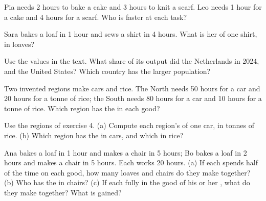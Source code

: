 \begin{exercise}[$\star$]\label{exo:g7:comparative-advantage:1}
Pia needs 2 hours to bake a cake and 3 hours to knit a scarf. Leo needs 1 hour for a cake
and 4 hours for a scarf. Who is faster at each task?
\end{exercise}

\begin{exercise}[$\star$]\label{exo:g7:comparative-advantage:2}
Sara bakes a loaf in 1 hour and sews a shirt in 4 hours. What is her  of
one shirt, in loaves?
\end{exercise}

\begin{exercise}[$\star$]\label{exo:g7:comparative-advantage:3}
Use the values in the text. What share of its output did the Netherlands  in 2024,
and the United States? Which country has the larger population?
\end{exercise}

\begin{exercise}[$\star$]\label{exo:g7:comparative-advantage:4}
Two invented regions make cars and rice. The North needs 50 hours for a car and 20 hours
for a tonne of rice; the South needs 80 hours for a car and 10 hours for a tonne of rice.
Which region has the  in each good?
\end{exercise}

\begin{exercise}[$\star\star$]\label{exo:g7:comparative-advantage:5}
Use the regions of exercise 4. (a) Compute each region's  of one car, in
tonnes of rice. (b) Which region has the  in cars, and which in
rice?
\end{exercise}

\begin{exercise}[$\star\star$]\label{exo:g7:comparative-advantage:6}
Ana bakes a loaf in 1 hour and makes a chair in 5 hours; Bo bakes a loaf in 2 hours and
makes a chair in 5 hours. Each works 20 hours. (a) If each spends half of the time on each
good, how many loaves and chairs do they make together? (b) Who has the  in chairs? (c) If each  fully in the good of his or her , what do they make together? What is gained?
\end{exercise}

